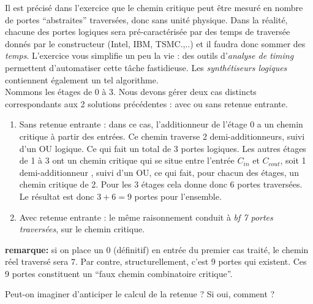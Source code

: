 \documentclass[a4paper,11pt]{article}
\begin{document}
\begin{cadre}
  Il est précisé dans l'exercice que le chemin critique peut être mesuré en nombre de portes ``abstraites'' traversées, donc sans unité physique. Dans la réalité, chacune des portes logiques sera pré-caractérisée par des temps de traversée donnés par le constructeur (Intel, IBM, TSMC.,..) et il faudra donc sommer des {\it temps}. L'exercice vous simplifie un peu la vie : des outils d'{\it analyse de timing} permettent d'automatiser cette tâche fastidieuse. Les {\it synthétiseurs logiques} contiennent également un tel algorithme.\\

Nommons les étages de 0 à 3. Nous devons gérer deux cas distincts correspondants aux 2 solutions précédentes : avec ou sans retenue entrante.
  \begin{enumerate}
    \item Sans retenue entrante : dans ce cas, l'additionneur de l'étage 0 a un chemin critique à partir des entrées. Ce chemin traverse 2 demi-additionneurs, suivi d'un OU logique. Ce qui fait un total de 3 portes logiques. Les autres étages de 1 à 3 ont un chemin critique qui se situe entre l'entrée $C_{in}$ et $C_{cout}$, soit 1 demi-additionneur , suivi d'un OU, ce qui fait, pour chacun des étages, un chemin critique de 2. Pour les 3 étages cela donne donc 6 portes traversées. Le résultat est donc {\bf $3+6=9$} portes pour l'ensemble.
   \item Avec retenue entrante : le même raisonnement conduit à {\it bf 7 portes traversées}, sur le chemin critique.
  \end{enumerate}

{\bf remarque:} si on place un $0$ (définitif) en entrée du premier cas traité, le chemin réel traversé sera $7$. Par contre, structurellement, c'est 9 portes qui existent. Ces 9 portes constituent un ``faux chemin combinatoire critique''.
\end{cadre}
\item Peut-on imaginer d'anticiper le calcul de la retenue ? Si oui, comment ?
\end{document}
